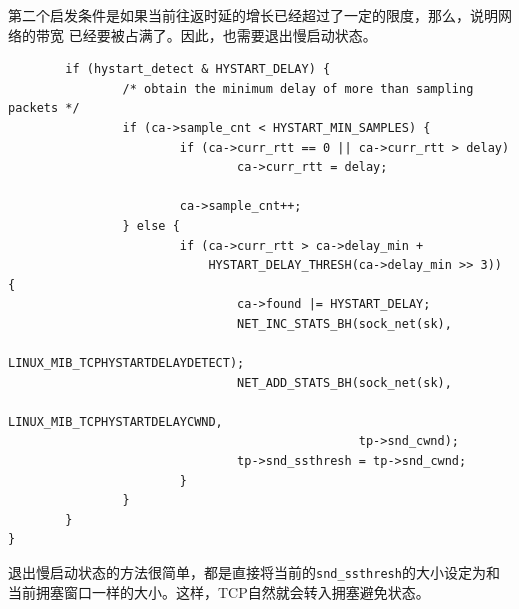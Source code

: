 第二个启发条件是如果当前往返时延的增长已经超过了一定的限度，那么，说明网络的带宽
已经要被占满了。因此，也需要退出慢启动状态。
\begin{verbatim}
        if (hystart_detect & HYSTART_DELAY) {
                /* obtain the minimum delay of more than sampling packets */
                if (ca->sample_cnt < HYSTART_MIN_SAMPLES) {
                        if (ca->curr_rtt == 0 || ca->curr_rtt > delay)
                                ca->curr_rtt = delay;

                        ca->sample_cnt++;
                } else {
                        if (ca->curr_rtt > ca->delay_min +
                            HYSTART_DELAY_THRESH(ca->delay_min >> 3)) {
                                ca->found |= HYSTART_DELAY;
                                NET_INC_STATS_BH(sock_net(sk),
                                                 LINUX_MIB_TCPHYSTARTDELAYDETECT);
                                NET_ADD_STATS_BH(sock_net(sk),
                                                 LINUX_MIB_TCPHYSTARTDELAYCWND,
                                                 tp->snd_cwnd);
                                tp->snd_ssthresh = tp->snd_cwnd;
                        }
                }
        }
}
\end{verbatim}
退出慢启动状态的方法很简单，都是直接将当前的\texttt{snd_ssthresh}的大小设定为和
当前拥塞窗口一样的大小。这样，TCP自然就会转入拥塞避免状态。
